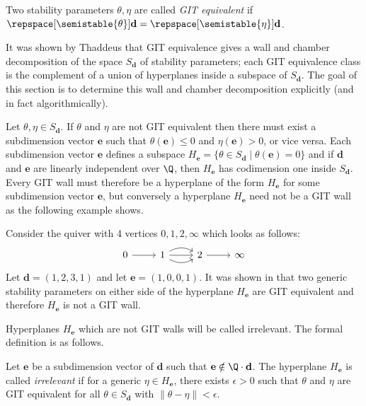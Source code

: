 \documentclass[11pt, a4paper]{amsart}
\begin{document}
	
	\begin{defn*}
		Two stability parameters $\theta, \eta$ are called \emph{GIT equivalent} if $\repspace[\semistable{\theta}]{\mathbf{d}} = \repspace[\semistable{\eta}]{\mathbf{d}}$.
	\end{defn*}

	It was shown by Thaddeus  that GIT equivalence gives a wall and chamber decomposition of the space $S_\mathbf{d}$ of stability parameters; each GIT equivalence class is the complement of a union of hyperplanes inside a subspace of $S_\mathbf{d}$. The goal of this section is to determine this wall and chamber decomposition explicitly (and in fact algorithmically).
	
	Let $\theta, \eta \in S_\mathbf{d}$. If $\theta$ and $\eta$ are not GIT equivalent then there must exist a subdimension vector $\mathbf{e}$ such that $\theta(\mathbf{e}) \leq 0$ and $\eta(\mathbf{e}) > 0$, or vice versa. Each subdimension vector $\mathbf{e}$ defines a subspace $H_\mathbf{e} = \{ \theta \in S_\mathbf{d} \mid \theta(\mathbf{e}) = 0\}$ and if $\mathbf{d}$ and $\mathbf{e}$ are linearly independent over $\Q$, then $H_{\mathbf{e}}$ has codimension one inside $S_{\mathbf{d}}$. Every GIT wall must therefore be a hyperplane of the form $H_\mathbf{e}$ for some subdimension vector $\mathbf{e}$, but conversely a hyperplane $H_\mathbf{e}$ need not be a GIT wall as the following example shows. 
	
	\begin{ex}
		Consider the quiver with 4 vertices $0,1,2,\infty$ which looks as follows:
		\[
			\begin{tikzcd}
				0 \arrow[r]& 1 \arrow[r] \arrow[r, bend right=30] \arrow[r, bend left=30] & 2 \arrow[r] & \infty
			\end{tikzcd}
		\]
		Let $\mathbf{d} = (1,2,3,1)$ and let $\mathbf{e} = (1,0,0,1)$. It was shown in  that two generic stability parameters on either side of the hyperplane $H_\mathbf{e}$ are GIT equivalent and therefore $H_\mathbf{e}$ is not a GIT wall.
	\end{ex}
	
	Hyperplanes $H_\mathbf{e}$ which are not GIT walls will be called irrelevant. The formal definition is as follows.
	
	\begin{defn*}
		Let $\mathbf{e}$ be a subdimension vector of $\mathbf{d}$ such that $\mathbf{e} \notin \Q\cdot \mathbf{d}$. The hyperplane $H_\mathbf{e}$ is called \emph{irrelevant} if for a generic $\eta \in H_\mathbf{e}$, there exists $\epsilon > 0$ such that $\theta$ and $\eta$ are GIT equivalent for all $\theta \in S_\mathbf{d}$ with $\left\|\theta - \eta\right\| < \epsilon$. 
	\end{defn*}
	
\end{document}
